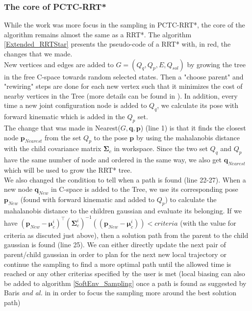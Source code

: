 \documentclass[letterpaper, 10 pt, conference]{ieeeconf}  %
\newcommand{\trsp}{{\!\scriptscriptstyle\top}}
\newcommand{\mb}[1]{{\boldsymbol{#1}}}
\begin{document}
\subsubsection{The core of PCTC-RRT*}\leavevmode\par \label{coreRRTstarChapter}
While the work was more focus in the sampling in PCTC-RRT*, the core of the algorithm remains almost the same as a RRT*. The algorithm \ref{Extended_RRTStar} presents the pseudo-code of a RRT* with, in red, the changes that we made.\\
New vertices and edges are added to $G=(Q_q,Q_p,E,Q_{sol})$ by growing the tree in the free C-space towards random selected states. Then a "choose parent" and "rewiring" steps are done for each new vertex such that it minimizes the cost of nearby vertices in the Tree (more details can be found in \cite{KaramanRRTStar} ). In addition, every time a new joint configuration node is added to $Q_q$, we calculate its pose with forward kinematic which is added in the $Q_p$ set. \\
 The change that was made in {\selectfont Nearest($G,\mb{q},\mb{p}$)} (line 1) is that it finds the closest node  $\mb{p}_{Nearest}$ from the set $Q_p$ to the pose $\mb{p}$ by using the mahalanobis distance with the child covariance matrix $\mb{\Sigma}_c$ in workspace. Since the two set $Q_q$ and $Q_p$ have the same number of node and ordered in the same way, we also get $\mb{q}_{Nearest}$ which will be used to grow the RRT* tree.\\
 We also changed the condition to tell when a path is found (line 22-27). When a new node $\mb{q}_{New}$ in C-space is added to the Tree, we use its corresponding pose $\mb{p}_{New}$ (found with forward kinematic and added to $Q_p$) to calculate the mahalanobis distance to the children gaussian and evaluate its belonging. If we have $(\mb{p}_{New}-\mb{\mu}_{c}^i)^{\trsp}(\mb{\Sigma}_{c}^i)^{-1} ((\mb{p}_{New}-\mb{\mu}_{c}^i)) < criteria$ (with the value for criteria as discuted just above), then a solution path from the parent to the child gaussian  is found (line 25). We can either directly update the next pair of parent/child gaussian in order to plan for the next new local trajectory or continue the sampling to find a more optimal path until the allowed time is reached or any other criterias specified by the user is met (local biasing can also be added to algorithm \ref{SoftEnv_Sampling} once a path is found as suggested by Baris \textit{and al.} in \cite{BarisRRT} in order to focus the sampling more around the best solution path)  \\
 
\end{document}
